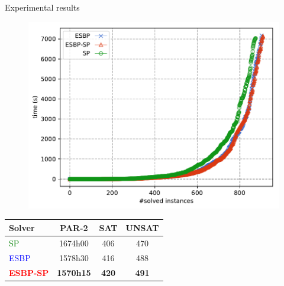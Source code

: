 \documentclass{beamer}
\begin{document}
\begin{frame}{Experimental results}

\begin{figure}[t]
	\centering
	{\includegraphics[scale=0.45]{images/combores2}}

\end{figure}
\centering

\begin{tabular}{lccc}
	Solver & PAR-2  & SAT & UNSAT\\
	\toprule
	\textcolor{green}{SP} & 1674h00  & 406 & 470 \\
	\textcolor{blue}{ESBP} & 1578h30  & 416 & 488\\
	\textcolor{red}{\textbf{ESBP-SP}} & \cellcolor{gray!30}\textbf{1570h15} &  \cellcolor{gray!30}\textbf{420} & \cellcolor{gray!30}\textbf{491}\\
\end{tabular}
\end{frame}
\end{document}
